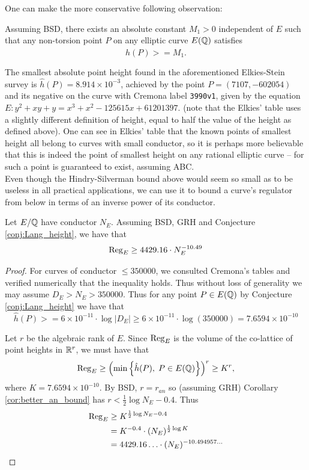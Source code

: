 \documentclass[10pt]{article}
\begin{document}
One can make the more conservative following observation:
\begin{corollary}\label{conj:point_height_lower_bound}
Assuming BSD, there exists an absolute constant $M_1 >0$ independent of $E$ such that any non-torsion point $P$ on any elliptic curve $E(\mathbb{Q})$ satisfies
\begin{equation}
\hat{h}(P) >= M_1 .
\end{equation}
\end{corollary}
The smallest absolute point height found in the aforementioned Elkies-Stein survey is $\hat{h}(P) = 8.914\times 10^{-3}$, achieved by the point $P = (7107,-602054)$ and its negative on the curve with Cremona label {\tt 3990v1}, given by the equation $E: y^2+xy+y=x^3+x^2-125615x+61201397$. (note that the Elkies' table uses a slightly different definition of height, equal to half the value of the height as defined above). One can see in Elkies' table that the known points of smallest height all belong to curves with small conductor, so it is perhaps more believable that this is indeed the point of smallest height on any rational elliptic curve -- for such a point is guaranteed to exist, assuming ABC. \\

Even though the Hindry-Silverman bound above would seem so small as to be useless in all practical applications, we can use it to bound a curve's regulator from below in terms of an inverse power of its conductor.
\begin{theorem}\label{them:regulator_lower_bound}
Let $E/\mathbb{Q}$ have conductor $N_E$. Assuming BSD, GRH and Conjecture \ref{conj:Lang_height}, we have that
\begin{equation}
\operatorname{Reg}_E \ge 4429.16 \cdot N_E^{-10.49}
\end{equation}
\end{theorem}
\begin{proof}
For curves of conductor $\le 350000$, we consulted Cremona's tables and verified numerically that the inequality holds. Thus without loss of generality we may assume $D_E > N_E > 350000$. Thus for any point $P \in E(\mathbb{Q})$ by Conjecture \ref{conj:Lang_height} we have that
\begin{equation}
\hat{h}(P) >= 6\times10^{-11} \cdot \log |D_E| \ge 6\times10^{-11} \cdot \log(350000) = 7.6594 \times 10^{-10}
\end{equation}

Let $r$ be the algebraic rank of $E$. Since $\operatorname{Reg}_E$ is the volume of the co-lattice of point heights in $\mathbb{R}^r$, we must have that
\begin{equation*}
\operatorname{Reg}_E \ge \left(\min \left\{ \hat{h}(P), \; P \in E(\mathbb{Q})\right\}\right)^r \ge  K^r,
\end{equation*}
where $K = 7.6594 \times 10^{-10}$. By BSD, $r = r_{an}$ so (assuming GRH) Corollary \ref{cor:better_an_bound} has $r < \frac{1}{2} \log N_E - 0.4$. Thus
\begin{align*}
\operatorname{Reg}_E &\ge K^{\frac{1}{2} \log N_E - 0.4} \\
&= K^{-0.4} \cdot (N_E)^{\frac{1}{2} \log K} \\
&= 4429.16 \ldots \cdot (N_E)^{-10.494957\ldots}
\end{align*}
\end{proof}
\end{document}
